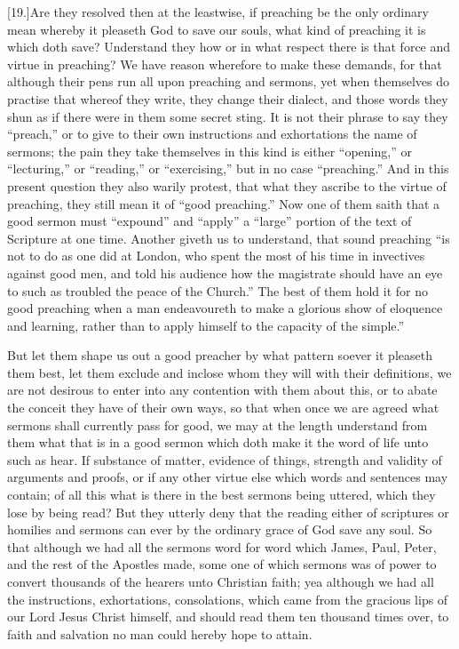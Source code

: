 [19.]Are they resolved then at the leastwise, if preaching be the only ordinary mean whereby it pleaseth God to save our souls, what kind of preaching it is which doth save? Understand they how or in what respect there is that force and virtue in preaching? We have reason wherefore to make these demands, for that although their pens run all upon preaching and sermons, yet when themselves do practise that whereof they write, they change their dialect, and those words they shun as if there were in them some secret sting. It is not their phrase to say they “preach,” or to give to their own instructions and exhortations the name of sermons; the pain they take themselves in this kind is either “opening,” or “lecturing,” or “reading,” or “exercising,” but in no case “preaching.”  And in this present question they also warily protest, that what they ascribe to the virtue of preaching, they still mean it of “good preaching.” Now one of them saith that a good sermon must “expound” and “apply” a “large” portion of the text of Scripture at one time. Another giveth us to understand, that sound preaching “is not to do as one did at London, who spent the most of his time in invectives against good men, and told his audience how the magistrate should have an eye to such as troubled the peace of the Church.” The best of them hold it for no good preaching when a man endeavoureth to make a glorious show of eloquence  and learning, rather than to apply himself to the capacity of the simple.”

But let them shape us out a good preacher by what pattern soever it pleaseth them best, let them exclude and inclose whom they will with their definitions, we are not desirous to enter into any contention with them about this, or to abate the conceit they have of their own ways, so that when once we are agreed what sermons shall currently pass for good, we may at the length understand from them what that is in a good sermon which doth make it the word of life unto such as hear. If substance of matter, evidence of things, strength and validity of arguments and proofs, or if any other virtue else which words and sentences may contain; of all this what is there in the best sermons being uttered, which they lose by being read? But they utterly deny that the reading either of scriptures or homilies and sermons can ever by the ordinary grace of God save any soul. So that although we had all the sermons word for word which James, Paul, Peter, and the rest of the Apostles made, some one of which sermons was of power to convert thousands of the hearers unto Christian faith; yea although we had all the instructions, exhortations, consolations, which came from the gracious lips of our Lord Jesus Christ himself, and should read them ten thousand times over, to faith and salvation no man could hereby hope to attain.

